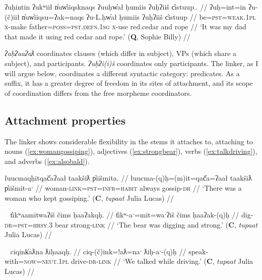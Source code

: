 \ex \label{ex:7uh7is1}
\begingl
\glpreamble ʔuḥintin ʔukʷiił n̓uw̓iiqsknaqs ʔuuḥw̓ał ḥumiis ʔuḥʔiiš c̓istuup.. //
\gla ʔuḥ=int=in ʔu-(č)iił n̓uw̓iiqsu=ʔak=naqs ʔu-L.ḥw̓ał ḥumiis ʔuḥʔiiš c̓istuup //
\glb be=\textsc{pst}=\textsc{weak.1pl} \textsc{x}-make father=\textsc{poss}=\textsc{pst.defn.1sg} \textsc{x}-use red.cedar and rope //
\glft `It was my dad that made it using red cedar and rope.' (\textbf{Q}, Sophie Billy) //
\endgl
\xe

\textit{ʔaḥʔaaʔaƛ} coordinates clauses (which differ in subject), VPs (which share a subject), and participants. \textit{ʔuḥʔi(i)š} coordinates only participants. The linker, as I will argue below, coordinates a different syntactic category: predicates. As a suffix, it has a greater degree of freedom in its sites of attachment, and its scope of coordination differs from the free morpheme coordinators.

\subsection{Attachment properties} \label{sec:link:attach}

The linker shows considerable flexibility in the stems it attaches to, attaching to nouns (\ref{ex:womangossiping}), adjectives (\ref{ex:strongbear}), verbs (\ref{ex:talkdriving}), and adverbs (\ref{ex:alsobald}).

\ex \label{ex:womangossiping}
\begingl
\glpreamble łuucmaqḥitqač̓aʔaał taakšiƛ p̓iišmita. //
\gla łuucma-(q)ḥ=(m)it=qač̓a=ʔaał taakšiƛ p̓iišmit-aˑ //
\glb woman-\textsc{link}=\textsc{pst}=\textsc{infr}=\textsc{habit} always gossip-\textsc{dr} //
\glft `There was a woman who kept gossiping.' (\textbf{C}, \textit{tupaat} Julia Lucas) //
\endgl
\xe

\ex~ \label{ex:strongbear}
\begingl
\glpreamble t̓ikʷaamitwaʔiš čims ḥaaʔakqḥ. //
\gla t̓ikʷ-aˑ=mit=waˑʔiš čims ḥaaʔak-(q)ḥ //
\glb dig-\textsc{dr}=\textsc{pst}=\textsc{hrsy.3} bear strong-\textsc{link} //
\glft `The bear was digging and strong.' (\textbf{C}, \textit{tupaat} Julia Lucas) //
\endgl
\xe

\ex~ \label{ex:talkdriving}
\begingl
\glpreamble ciqink̓aƛna ƛiḥaaqḥ. //
\gla ciq-(č)ink=!aƛ=naˑ ƛiḥ-aˑ-(q)ḥ //
\glb speak-with=\textsc{now}=\textsc{neut.1pl} drive-\textsc{dr}-\textsc{link} //
\glft `We talked while driving.' (\textbf{C}, \textit{tupaat} Julia Lucas) //
\endgl
\xe



\vspace{5pt}

